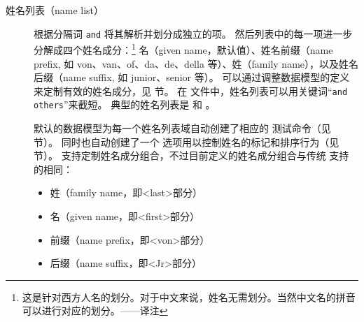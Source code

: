 \begin{description}


\item[姓名列表（name list）] 根据分隔词 \texttt{and} 将其解析并划分成独立的项。
然后列表中的每一项进一步分解成四个姓名成分：\footnote{
	这是针对西方人名的划分。对于中文来说，姓名无需划分。当然中文名的拼音可以进行对应的划分。——译注}
名（given name，默认值）、姓名前缀（name prefix, 如 von、van、of、da、de、della 等）、姓（family name），以及姓名后缀（name suffix, 如 junior、senior 等）。
可以通过调整数据模型的定义来定制有效的姓名成分，见  节。
在  文件中，姓名列表可以用关键词“\texttt{and others}”来截短。
典型的姓名列表是  和 。


默认的数据模型为每一个姓名列表域自动创建了相应的  测试命令（见  节）。
同时也自动创建了一个  选项用以控制姓名的标记和排序行为（见  节）。
\biber 支持定制姓名成分组合，不过目前定义的姓名成分组合与传统 \BibTeX 支持的相同：

\begin{itemize}
	\item 姓（family name，即<last>部分）%
	\item 名（given name，即<first>部分） %
	\item 前缀（name prefix，即<von>部分）%
	\item 后缀（name suffix，即<Jr>部分）%
\end{itemize}


\end{description}
